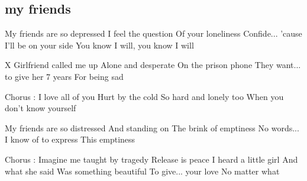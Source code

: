 \subsection*{my friends   }
\begin{guitar}
My friends are so depressed
I feel the question
Of your loneliness
Confide... 'cause I'll be on your side
You know I will, you know I will



X Girlfriend called me up
Alone and desperate
On the prison phone
They want... to give her 7 years
For being sad



Chorus :
I love all of you
Hurt by the cold
So hard and lonely too
When you don't know yourself



My friends are so distressed
And standing on
The brink of emptiness
No words... I know of to express
This emptiness



Chorus :
Imagine me taught by tragedy
Release is peace
I heard a little girl
And what she said
Was something beautiful
To give... your love
No matter what 
\end{guitar}
